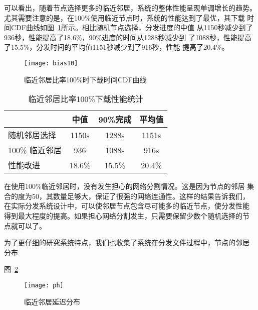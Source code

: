 可以看出，随着节点选择更多的临近邻居，系统的整体性能呈现单调增长的趋势。
尤其需要注意的是，在100\%使用临近节点时，系统的性能达到了最优，其下载
时间CDF曲线如图~\ref{fig:bias10}所示。相比随机节点选择，分发进度的中值
从1150秒减少到了936秒，性能提高了18.6\%，90\%进度的时间从1288秒减少到
了1088秒，性能提高了15.5\%，分发时间的平均值1151秒减少到了916秒，性能
提高了20.4\%。

\begin{figure}
  \centering
  \begin{minipage}{0.8\linewidth}
    \centering
    \texttt{[image: bias10]}
    \caption{临近邻居比率100\%时下载时间CDF曲线}
    \label{fig:bias10}
  \end{minipage}
\end{figure}

\begin{table}
\centering
\begin{minipage}{0.8\linewidth}
\centering
\caption{临近邻居比率100\%下载性能统计}
\label{tbl:bias10}
\begin{tabular}{lccc}

\toprule[1.5pt]
              & 中值 & 90\%完成 & 平均值\\
\midrule[1pt]
随机邻居选择  & 1150s & 1288s & 1151s\\
100\% 临近邻居 & 936 & 1088s & 916s\\
性能改进      & 18.6\% & 15.5\% & 20.4\%\\
\bottomrule[1.5pt]
\end{tabular}
\end{minipage}
\end{table}

在使用100\%临近邻居时，没有发生担心的网络分割情况。这是因为节点的邻居
集合的度为50，其数量足够大，保证了很强的网络连通性。这样的结果告诉我们，
在实际分发系统设计中，可以使邻居节点包含尽可能多的临近节点，使分发性能
得到最大程度的提高。如果担心网络分割发生，只需要保留少数个随机选择的节
点就可以了。

为了更仔细的研究系统特点，我们也收集了系统在分发文件过程中，节点的邻居
分布


图~\ref{fig:bias10path}

\begin{figure}
  \centering
  \begin{minipage}{0.8\linewidth}
    \centering
    \texttt{[image: ph]}
    \caption{临近邻居延迟分布}
    \label{fig:bias10path}
  \end{minipage}
\end{figure}



